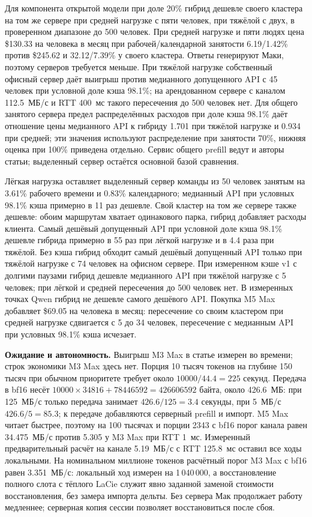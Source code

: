 Для компонента открытой модели при доле 20\% гибрид дешевле своего кластера на том же сервере
при средней нагрузке с пяти человек, при тяжёлой с двух, в проверенном диапазоне до 500 человек.
При средней нагрузке и пяти людях цена \$130.33 на человека в месяц при рабочей/календарной занятости
6.19/1.42\% против \$245.62 и 32.12/7.39\% у своего кластера. Ответы генерируют Маки, поэтому серверов требуется меньше.
При тяжёлой нагрузке собственный офисный сервер даёт выигрыш против медианного допущенного API
с 45 человек при условной доле кэша 98.1\%; на арендованном сервере с каналом 112.5~МБ/с и RTT 400~мс
такого пересечения до 500 человек нет. Для общего занятого сервера предел распределённых расходов
при доле кэша 98.1\% даёт отношение цены медианного API к гибриду 1.701 при тяжёлой нагрузке
и 0.934 при средней; эти значения используют распределение при занятости 70\%, нижняя оценка при 100\% приведена отдельно.
Сервис общего prefill ведут и авторы статьи; выделенный сервер остаётся основной базой сравнения.

Лёгкая нагрузка оставляет выделенный сервер команды из 50 человек занятым на 3.61\% рабочего времени
и 0.83\% календарного; медианный API при условных 98.1\% кэша примерно в 11 раз дешевле.
Свой кластер на том же сервере также дешевле: обоим маршрутам хватает одинакового парка, гибрид добавляет расходы клиента.
Самый дешёвый допущенный API при условной доле кэша 98.1\% дешевле гибрида примерно в 55 раз при лёгкой нагрузке
и в 4.4 раза при тяжёлой. Без кэша гибрид обходит самый дешёвый допущенный API только при тяжёлой нагрузке
с 74 человек на офисном сервере. При измеренном кэше v1 с долгими паузами гибрид дешевле медианного API при тяжёлой нагрузке с 5 человек;
при лёгкой и средней пересечения до 500 человек нет. В измеренных точках Qwen гибрид не дешевле самого дешёвого API.
Покупка M5 Max добавляет \$69.05 на человека в месяц: пересечение со своим кластером при средней нагрузке
сдвигается с 5 до 34 человек, пересечение с медианным API при условных 98.1\% кэша исчезает.

\textbf{Ожидание и автономность.} Выигрыш M3 Max в статье измерен во времени; строк экономики M3 Max здесь нет.
Порция 10 тысяч токенов на глубине 150 тысяч при обычном приоритете требует около $10000/44.4=225$ секунд.
Передача в bf16 несёт $10000\times34816+78446592=426606592$ байта, около 426.6~МБ:
при 125~МБ/с только передача занимает $426.6/125=3.4$ секунды, при 5~МБ/с $426.6/5=85.3$;
к передаче добавляются серверный prefill и импорт. M5 Max читает быстрее, поэтому на 100 тысячах и порции 2343
с bf16 порог канала равен 34.475~МБ/с против 5.305 у M3 Max при RTT 1~мс.
Измеренный предварительный расчёт на канале 5.19~МБ/с с RTT 125.8~мс оставил все ходы локальными.
На номинальном миллионе токенов расчётный порог M3 Max с bf16 равен 3.351~МБ/с: локальный ход измерен на 1\,040\,000,
а восстановление полного слота с тёплого LaCie служит явно заданной заменой стоимости восстановления, без замера импорта дельты.
Без сервера Мак продолжает работу медленнее; серверная копия сессии позволяет восстановиться после сбоя.

